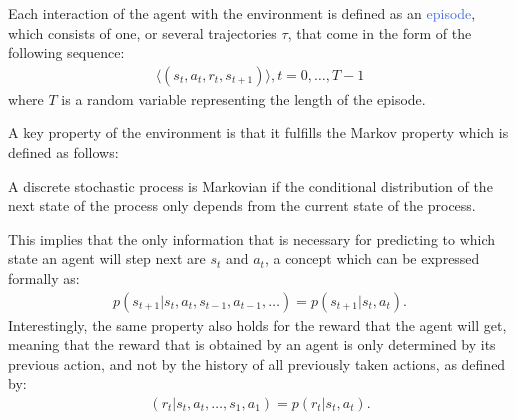 Each interaction of the agent with the environment is defined as an \textcolor{RoyalBlue}{episode}, which consists of one, or several trajectories $\tau$, that come in the form of the following sequence:
\begin{align}
	\langle(s_t,a_t,r_t,s_{t+1})\rangle,t=0,\ldots,T-1
\end{align}
where $T$ is a random variable representing the length of the episode.

A key property of the environment is that it fulfills the Markov property which is defined as follows:
\begin{definition}
	A discrete stochastic process is Markovian if the conditional distribution of the next state of the process only depends from the current state of the process.
\end{definition}
This implies that the only information that is necessary for predicting to which state an agent will step next are $s_t$ and $a_t$, a concept which can be expressed formally as:
\begin{align}
	p(s_{t+1}|s_t, a_t, s_{t-1}, a_{t-1}, \ldots) = p(s_{t+1} | s_t, a_t).
\end{align}
Interestingly, the same property also holds for the reward that the agent will get, meaning that the reward that is obtained by an agent is only determined by its previous action, and not by the history of all previously taken actions, as defined by:
\begin{align}
	(r_t| s_t, a_t, \ldots, s_1, a_1) = p(r_t|s_t,a_t).
\end{align}


